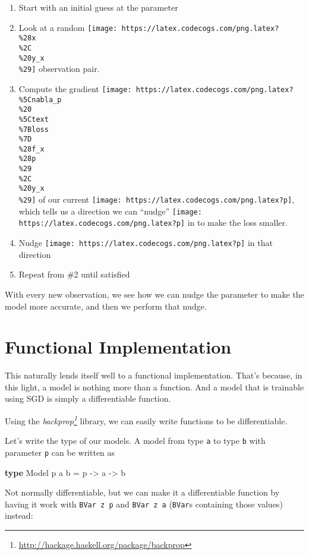 \documentclass[]{article}
\newenvironment{Shaded}{}{}
\newcommand{\DataTypeTok}[1]{\textcolor[rgb]{0.56,0.13,0.00}{#1}}
\newcommand{\FunctionTok}[1]{\textcolor[rgb]{0.02,0.16,0.49}{#1}}
\newcommand{\KeywordTok}[1]{\textcolor[rgb]{0.00,0.44,0.13}{\textbf{#1}}}
\newcommand{\NormalTok}[1]{#1}
\newcommand{\OtherTok}[1]{\textcolor[rgb]{0.00,0.44,0.13}{#1}}
\renewcommand{\href}[2]{#2\footnote{\url{#1}}}
\begin{document}
\begin{enumerate}
\def\labelenumi{\arabic{enumi}.}
\tightlist
\item
  Start with an initial guess at the parameter
\item
  Look at a random
  \texttt{[image: https://latex.codecogs.com/png.latex?\\\%28x\\\%2C\\\%20y\_x\\\%29]}
  observation pair.
\item
  Compute the gradient
  \texttt{[image: https://latex.codecogs.com/png.latex?\\\%5Cnabla\_p\\\%20\\\%5Ctext\\\%7Bloss\\\%7D\\\%28f\_x\\\%28p\\\%29\\\%2C\\\%20y\_x\\\%29]}
  of our current \texttt{[image: https://latex.codecogs.com/png.latex?p]}, which
  tells us a direction we can ``nudge''
  \texttt{[image: https://latex.codecogs.com/png.latex?p]} in to make the loss
  smaller.
\item
  Nudge \texttt{[image: https://latex.codecogs.com/png.latex?p]} in that
  direction
\item
  Repeat from \#2 until satisfied
\end{enumerate}

With every new observation, we see how we can nudge the parameter to make the
model more accurate, and then we perform that nudge.

\hypertarget{functional-implementation}{%
\section{Functional Implementation}\label{functional-implementation}}

This naturally lends itself well to a functional implementation. That's because,
in this light, a model is nothing more than a function. And a model that is
trainable using SGD is simply a differentiable function.

Using the \emph{\href{http://hackage.haskell.org/package/backprop}{backprop}}
library, we can easily write functions to be differentiable.

Let's write the type of our models. A model from type \texttt{a} to type
\texttt{b} with parameter \texttt{p} can be written as

\begin{Shaded}
\begin{Highlighting}[]
\KeywordTok{type} \DataTypeTok{Model}\NormalTok{ p a b }\FunctionTok{=}\NormalTok{ p }\OtherTok{->}\NormalTok{ a }\OtherTok{->}\NormalTok{ b}
\end{Highlighting}
\end{Shaded}

Not normally differentiable, but we can make it a differentiable function by
having it work with \texttt{BVar\ z\ p} and \texttt{BVar\ z\ a} (\texttt{BVar}s
containing those values) instead:
\end{document}
